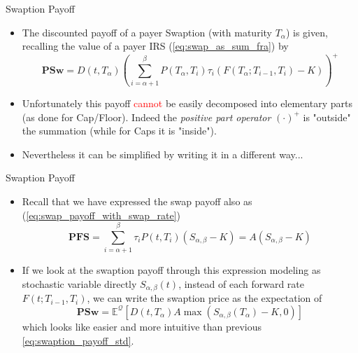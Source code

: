 \documentclass{beamer}
\begin{document}
\begin{frame}{Swaption Payoff}
\begin{itemize}
	\item<1-> The discounted payoff of a payer Swaption (with maturity $T_\alpha$) is given, recalling the value of a payer IRS (\cref{eq:swap_as_sum_fra}) by
	\begin{equation}
		\textbf{PSw}=D(t,T_\alpha)\left(\sum_{i=\alpha+1}^\beta P(T_\alpha,T_i)\tau_i (F(T_\alpha;T_{i-1},T_i) - K)\right)^+
		\label{eq:swaption_payoff_std}
	\end{equation}
	\item<2-> Unfortunately this payoff \textcolor{red}{cannot} be easily decomposed into elementary parts (as done for Cap/Floor). Indeed the \emph{positive part operator} $(\cdot)^+$ is "outside" the summation (while for Caps it is "inside").
	\item<3-> Nevertheless it can be simplified by writing it in a different way...
\end{itemize}
\end{frame}

\begin{frame}{Swaption Payoff}
\begin{itemize}
	\item<1-> Recall that we have expressed the swap payoff also as (\cref{eq:swap_payoff_with_swap_rate})
	\begin{equation*}
	\textbf{PFS}=\sum_{i=\alpha+1}^\beta \tau_i P(t,T_i)(S_{\alpha,\beta}-K) = A(S_{\alpha,\beta}-K)
	\end{equation*}
	\item<2-> If we look at the swaption payoff through this expression modeling as stochastic variable directly $S_{\alpha,\beta}(t)$, instead of each forward rate $F(t;T_{i-1},T_i)$, we can write the swaption price as the expectation of
	\begin{equation}
		\textbf{PSw}=\mathbb{E}^{\mathcal{Q}}\left[D(t,T_\alpha)A\max(S_{\alpha,\beta}(T_\alpha)-K, 0)\right]
	\end{equation}
	which looks like easier and more intuitive than previous \cref{eq:swaption_payoff_std}.
\end{itemize}
\end{frame}
\end{document}
